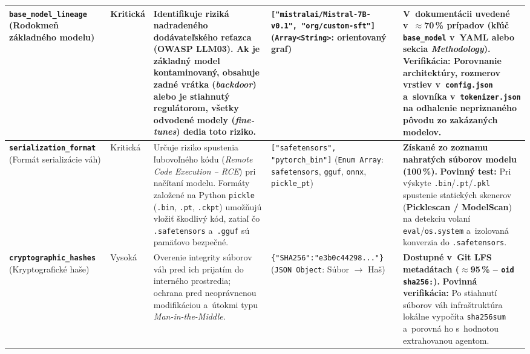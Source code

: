 {\begin{xltabular}{\textwidth}{@{}>{\raggedright\arraybackslash}p{2.6cm}>{\raggedright\arraybackslash}p{1.5cm}>{\raggedright\arraybackslash}X>{\raggedright\arraybackslash}p{3.1cm}>{\raggedright\arraybackslash}X@{}}
\textbf{\texttt{base\_\allowbreak model\_\allowbreak lineage}} \newline (Rodokmeň základného modelu) &
Kritická &
Identifikuje riziká nadradeného dodávateľského reťazca (OWASP LLM03). Ak je základný model kontaminovaný, obsahuje zadné vrátka (\emph{backdoor}) alebo je stiahnutý regulátorom, všetky odvodené modely (\emph{fine-tunes}) dedia toto riziko. &
\texttt{["mistralai/\allowbreak Mistral-7B-v0.1", "org/custom-sft"]} \newline (\texttt{Array<String>}: orientovaný graf) &
\textbf{V~dokumentácii uvedené v~$\approx$70\,\% prípadov (kľúč \texttt{base\_model} v~YAML alebo sekcia \emph{Methodology}).} \textbf{Verifikácia:} Porovnanie architektúry, rozmerov vrstiev v~\texttt{config.json} a~slovníka v~\texttt{tokenizer.json} na odhalenie nepriznaného pôvodu zo zakázaných modelov. \\
\midrule

\textbf{\texttt{serialization\_\allowbreak format}} \newline (Formát serializácie váh) &
Kritická &
Určuje riziko spustenia ľubovoľného kódu (\emph{Remote Code Execution -- RCE}) pri načítaní modelu. Formáty založené na Python \texttt{pickle} (\texttt{.bin}, \texttt{.pt}, \texttt{.ckpt}) umožňujú vložiť škodlivý kód, zatiaľ čo \texttt{.safetensors} a~\texttt{.gguf} sú pamäťovo bezpečné. &
\texttt{["safetensors", "pytorch\_bin"]} \newline (\texttt{Enum Array}: \texttt{safetensors}, \texttt{gguf}, \texttt{onnx}, \texttt{pickle\_pt}) &
\textbf{Získané zo zoznamu nahratých súborov modelu (100\,\%).} \textbf{Povinný test:} Pri výskyte \texttt{.bin}/\texttt{.pt}/\texttt{.pkl} spustenie statických skenerov (\textbf{Picklescan / ModelScan}) na detekciu volaní \texttt{eval}/\texttt{os.system} a~izolovaná konverzia do \texttt{.safetensors}. \\
\midrule

\textbf{\texttt{cryptographic\_\allowbreak hashes}} \newline (Kryptografické haše) &
Vysoká &
Overenie integrity súborov váh pred ich prijatím do interného prostredia; ochrana pred neoprávnenou modifikáciou a~útokmi typu \emph{Man-in-the-Middle}. &
\texttt{\{"SHA256":\allowbreak "e3b0c44298..."\}} \newline (\texttt{JSON Object}: Súbor $\rightarrow$ Haš) &
\textbf{Dostupné v~Git LFS metadátach ($\approx$95\,\% -- \texttt{oid sha256:}).} \textbf{Povinná verifikácia:} Po stiahnutí súborov váh infraštruktúra lokálne vypočíta \texttt{sha256sum} a~porovná ho s~hodnotou extrahovanou agentom. \\
\midrule


\end{xltabular}}
